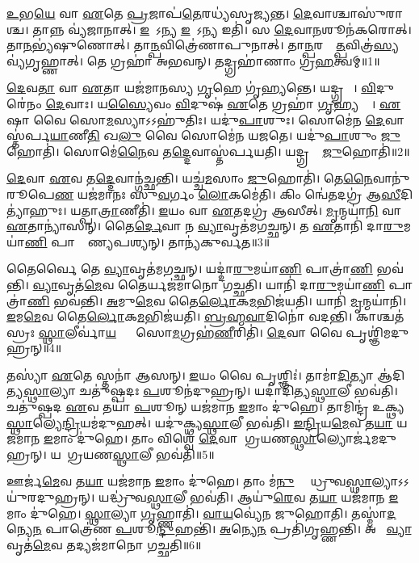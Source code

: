 \ul{𑌉}𑌭\ul{𑌯𑍇} 𑌵𑌾 \ul{𑌏}𑌤𑍇 \ul{𑌪𑍍𑌰}𑌜𑌾𑌪॑\ul{𑌤𑍇}𑌰𑌧𑍍𑌯॑𑌸𑍃𑌜𑍍𑌯𑌨𑍍𑌤।
\ul{𑌦𑍇}𑌵𑌾𑌶𑍍𑌚𑌾𑌸𑍁॑𑌰𑌾𑌶𑍍𑌚।
𑌤𑌾𑌨𑍍𑌨 𑌵𑍍𑌯॑𑌜𑌾𑌨𑌾𑌤𑍍।
\ul{𑌇}𑌮𑍇᳚𑌽𑌨𑍍𑌯 \ul{𑌇}𑌮𑍇᳚𑌽𑌨𑍍𑌯 𑌇𑌤𑌿॑।
𑌸 \ul{𑌦𑍇}𑌵𑌾\ul{𑌨}\ul{}𑌶𑍂𑌨॑𑌕𑌰𑍋𑌤𑍍।
𑌤𑌾\ul{𑌨}𑌭𑍍𑌯॑𑌷𑍁𑌣𑍋𑌤𑍍।
𑌤𑌾\ul{𑌨𑍍𑌪}𑌵𑌿𑌤𑍍𑌰𑍇॑𑌣𑌾𑌪𑍁𑌨𑌾𑌤𑍍।
𑌤𑌾\ul{𑌨𑍍𑌪}𑌰𑌸𑍍𑌤𑌾᳚\ul{𑌤𑍍𑌪}𑌵𑌿𑌤𑍍𑌰॑\ul{𑌸𑍍𑌯} 𑌵𑍍𑌯॑𑌗𑍃𑌹𑍍𑌣𑌾𑌤𑍍।
𑌤𑍇 𑌗𑍍𑌰𑌹𑌾॑ 𑌅𑌭𑌵𑌨𑍍।
𑌤𑌦𑍍𑌗𑍍𑌰𑌹𑌾॑𑌣𑌾𑌂 𑌗𑍍𑌰\ul{𑌹}𑌤𑍍𑌵𑌮𑍍॥1॥

\ul{𑌦𑍇}𑌵\ul{𑌤𑌾} 𑌵𑌾 \ul{𑌏}𑌤𑌾 𑌯𑌜॑𑌮𑌾𑌨𑌸𑍍𑌯 \ul{𑌗𑍃}𑌹𑍇 𑌗𑍃॑𑌹𑍍𑌯𑌨𑍍𑌤𑍇।
𑌯𑌦𑍍𑌗𑍍𑌰𑌹𑌾𑌃᳚।
\ul{𑌵𑌿}𑌦𑍁𑌰𑍇॑𑌨𑌂 \ul{𑌦𑍇}𑌵𑌾𑌃।
𑌯\ul{𑌸𑍍𑌯𑍈}𑌵𑌂 \ul{𑌵𑌿}𑌦𑍁𑌷॑ \ul{𑌏}𑌤𑍇 𑌗𑍍𑌰𑌹𑌾॑ \ul{𑌗𑍃}𑌹𑍍𑌯𑌨𑍍𑌤𑍇᳚।
\ul{𑌏}𑌷𑌾 𑌵𑍈 𑌸𑍋\ul{𑌮}𑌸𑍍𑌯𑌾\-𑌽𑌽𑌹𑍁॑𑌤𑌿𑌃।
𑌯𑌦𑍁॑\ul{𑌪𑌾}\ul{}𑌶𑍁𑌃।
𑌸𑍋𑌮𑍇॑𑌨 \ul{𑌦𑍇}𑌵𑌾𑌸𑍍𑌤॑𑌰𑍍𑌪\ul{𑌯𑌾}𑌣𑍀\ul{𑌤𑌿} 𑌖\ul{𑌲𑍁} 𑌵𑍈 𑌸𑍋𑌮𑍇॑𑌨 𑌯𑌜𑌤𑍇।
𑌯𑌦𑍁॑\ul{𑌪𑌾}\ul{}𑌶𑍁𑌂 \ul{𑌜𑍁}𑌹𑍋𑌤𑌿॑।
𑌸𑍋𑌮𑍇॑\ul{𑌨𑍈}𑌵 𑌤\ul{𑌦𑍍𑌦𑍇}𑌵𑌾𑌸𑍍𑌤॑𑌰𑍍𑌪𑌯𑌤𑌿।
𑌯𑌦𑍍𑌗𑍍𑌰𑌹𑌾𑌂᳚ \ul{𑌜𑍁}𑌹𑍋𑌤𑌿॑॥2॥

\ul{𑌦𑍇}𑌵𑌾 \ul{𑌏}𑌵 𑌤\ul{𑌦𑍍𑌦𑍇}𑌵𑌾𑌨𑍍𑌗॑𑌚𑍍𑌛𑌨𑍍𑌤𑌿।
𑌯𑌚𑍍𑌚॑\ul{𑌮}𑌸𑌾𑌂 \ul{𑌜𑍁}𑌹𑍋𑌤𑌿॑।
𑌤𑍇\ul{𑌨𑍈}𑌵𑌾𑌨𑍁॑𑌰𑍂𑌪𑍇\ul{𑌣} 𑌯𑌜॑𑌮𑌾𑌨𑌃 𑌸𑍁\ul{𑌵}𑌰𑍍𑌗𑌂 \ul{𑌲𑍋}𑌕𑌮𑍇॑𑌤𑌿।
𑌕𑌿𑌂 𑌨𑍍𑌵𑍇॑𑌤𑌦𑌗𑍍𑌰॑ 𑌆\ul{𑌸𑍀}𑌦𑌿𑌤𑍍𑌯𑌾॑𑌹𑍁𑌃।
𑌯𑌤𑍍𑌪𑌾\ul{𑌤𑍍𑌰𑌾}𑌣𑍀𑌤𑌿॑।
\ul{𑌇}𑌯𑌂 𑌵𑌾 \ul{𑌏}𑌤𑌦𑌗𑍍𑌰॑ 𑌆𑌸𑍀𑌤𑍍।
\ul{𑌮𑍃}𑌨𑍍𑌮𑌯𑌾॑\ul{𑌨𑌿} 𑌵𑌾 \ul{𑌏}𑌤𑌾𑌨𑍍𑌯𑌾॑𑌸𑌨𑍍।
𑌤𑍈\ul{𑌰𑍍𑌦𑍇}𑌵𑌾 𑌨 \ul{𑌵𑍍𑌯𑌾}𑌵𑍃𑌤॑𑌮𑌗𑌚𑍍𑌛𑌨𑍍।
𑌤 \ul{𑌏}𑌤𑌾𑌨𑌿॑ 𑌦𑌾\ul{𑌰𑍁}𑌮𑌯𑌾॑\ul{𑌣𑌿} 𑌪𑌾𑌤𑍍𑌰𑌾᳚𑌣𑍍𑌯𑌪𑌶𑍍𑌯𑌨𑍍।
𑌤𑌾𑌨𑍍𑌯॑𑌕𑍁𑌰𑍍𑌵𑌤॥3॥

𑌤𑍈𑌰𑍍𑌵𑍈 𑌤𑍇 \ul{𑌵𑍍𑌯𑌾}𑌵𑍃𑌤॑𑌮𑌗𑌚𑍍𑌛𑌨𑍍।
𑌯𑌦𑍍𑌦𑌾॑\ul{𑌰𑍁}𑌮𑌯𑌾॑\ul{𑌣𑌿} 𑌪𑌾𑌤𑍍𑌰𑌾॑\ul{𑌣𑌿} 𑌭𑌵॑𑌨𑍍𑌤𑌿।
\ul{𑌵𑍍𑌯𑌾}𑌵𑍃𑌤॑\ul{𑌮𑍇}𑌵 𑌤𑍈𑌰𑍍𑌯𑌜॑𑌮𑌾𑌨𑍋 𑌗𑌚𑍍𑌛𑌤𑌿।
𑌯𑌾𑌨𑌿॑ 𑌦𑌾\ul{𑌰𑍁}𑌮𑌯𑌾॑\ul{𑌣𑌿} 𑌪𑌾𑌤𑍍𑌰𑌾॑\ul{𑌣𑌿} 𑌭𑌵॑𑌨𑍍𑌤𑌿।
\ul{𑌅}𑌮𑍁\ul{𑌮𑍇}𑌵 𑌤𑍈\ul{𑌰𑍍𑌲𑍋}𑌕\ul{𑌮}𑌭𑌿𑌜॑𑌯𑌤𑌿।
𑌯𑌾𑌨𑌿॑ \ul{𑌮𑍃}𑌨𑍍𑌮𑌯𑌾॑𑌨𑌿।
\ul{𑌇}𑌮\ul{𑌮𑍇}𑌵 𑌤𑍈\ul{𑌰𑍍𑌲𑍋}𑌕\ul{𑌮}𑌭𑌿𑌜॑𑌯𑌤𑌿।
\ul{𑌬𑍍𑌰}\ul{𑌹𑍍𑌮}\ul{𑌵𑌾}𑌦𑌿𑌨𑍋॑ 𑌵𑌦𑌨𑍍𑌤𑌿।
𑌕𑌾𑌶𑍍𑌚𑌤॑𑌸𑍍𑌰𑌃 \ul{𑌸𑍍𑌥𑌾}𑌲𑍀𑌰𑍍𑌵𑌾॑\ul{𑌯}𑌵𑍍𑌯𑌾𑌃᳚ 𑌸𑍋\ul{𑌮}𑌗𑍍𑌰𑌹॑\ul{𑌣𑍀}𑌰𑌿𑌤𑌿॑।
\ul{𑌦𑍇}𑌵𑌾 𑌵𑍈 𑌪𑍃𑌶𑍍𑌞𑌿॑𑌮𑌦𑍁𑌹𑍍𑌰𑌨𑍍॥4॥

𑌤𑌸𑍍𑌯𑌾॑ \ul{𑌏}𑌤𑍇 𑌸𑍍𑌤𑌨𑌾॑ 𑌆𑌸𑌨𑍍।
\ul{𑌇}𑌯𑌂 𑌵𑍈 𑌪𑍃𑌶𑍍𑌞𑌿𑌃॑।
𑌤𑌾𑌮𑌾॑\ul{𑌦𑌿}𑌤𑍍𑌯𑌾 𑌆॑𑌦𑌿𑌤𑍍𑌯\ul{𑌸𑍍𑌥𑌾}𑌲𑍍𑌯𑌾 𑌚𑌤𑍁॑𑌷𑍍𑌪𑌦𑌃 \ul{𑌪}𑌶𑍂𑌨॑𑌦𑍁𑌹𑍍𑌰𑌨𑍍।
𑌯𑌦𑌾॑𑌦𑌿𑌤𑍍𑌯\ul{𑌸𑍍𑌥𑌾}𑌲𑍀 𑌭𑌵॑𑌤𑌿।
𑌚𑌤𑍁॑𑌷𑍍𑌪𑌦 \ul{𑌏}𑌵 𑌤𑌯𑌾॑ \ul{𑌪}𑌶𑍂𑌨𑍍 𑌯𑌜॑𑌮𑌾𑌨 \ul{𑌇}𑌮𑌾𑌂 𑌦𑍁॑𑌹𑍇।
𑌤𑌾𑌮𑌿𑌨𑍍𑌦𑍍𑌰॑ 𑌉𑌕𑍍𑌥𑍍𑌯\ul{𑌸𑍍𑌥𑌾}𑌲𑍍𑌯𑍇\ul{𑌨𑍍𑌦𑍍𑌰𑌿}𑌯𑌮॑𑌦𑍁𑌹𑌤𑍍।
𑌯𑌦𑍁॑𑌕𑍍𑌥𑍍𑌯\ul{𑌸𑍍𑌥𑌾}𑌲𑍀 𑌭𑌵॑𑌤𑌿।
\ul{𑌇}\ul{𑌨𑍍𑌦𑍍𑌰𑌿}𑌯\ul{𑌮𑍇}𑌵 𑌤\ul{𑌯𑌾} 𑌯𑌜॑𑌮𑌾𑌨 \ul{𑌇}𑌮𑌾𑌂 𑌦𑍁॑𑌹𑍇।
𑌤𑌾𑌂 𑌵𑌿𑌶𑍍𑌵𑍇॑ \ul{𑌦𑍇}𑌵𑌾 𑌆᳚𑌗𑍍𑌰𑌯𑌣\ul{𑌸𑍍𑌥𑌾}𑌲𑍍𑌯𑍋𑌰𑍍𑌜॑𑌮𑌦𑍁𑌹𑍍𑌰𑌨𑍍।
𑌯𑌦𑌾᳚𑌗𑍍𑌰𑌯𑌣\ul{𑌸𑍍𑌥𑌾}𑌲𑍀 𑌭𑌵॑𑌤𑌿॥5॥

𑌊𑌰𑍍𑌜॑\ul{𑌮𑍇}𑌵 𑌤\ul{𑌯𑌾} 𑌯𑌜॑𑌮𑌾𑌨 \ul{𑌇}𑌮𑌾𑌂 𑌦𑍁॑𑌹𑍇।
𑌤𑌾𑌂 𑌮॑\ul{𑌨𑍁}𑌷𑍍𑌯𑌾᳚ 𑌧𑍍𑌰𑍁𑌵\ul{𑌸𑍍𑌥𑌾}𑌲𑍍𑌯𑌾\-𑌽𑌽𑌯𑍁॑𑌰𑌦𑍁𑌹𑍍𑌰𑌨𑍍।
𑌯𑌦𑍍𑌧𑍍𑌰𑍁॑𑌵\ul{𑌸𑍍𑌥𑌾}𑌲𑍀 𑌭𑌵॑𑌤𑌿।
𑌆𑌯𑍁॑\ul{𑌰𑍇}𑌵 𑌤\ul{𑌯𑌾} 𑌯𑌜॑𑌮𑌾𑌨 \ul{𑌇}𑌮𑌾𑌂 𑌦𑍁॑𑌹𑍇।
\ul{𑌸𑍍𑌥𑌾}𑌲𑍍𑌯𑌾 \ul{𑌗𑍃}𑌹𑍍𑌣𑌾𑌤𑌿॑।
\ul{𑌵𑌾}\ul{𑌯}𑌵𑍍𑌯𑍇॑𑌨 𑌜𑍁𑌹𑍋𑌤𑌿।
𑌤𑌸𑍍𑌮𑌾॑\ul{𑌦}𑌨𑍍𑌯𑍇\ul{𑌨} 𑌪𑌾𑌤𑍍𑌰𑍇॑𑌣 \ul{𑌪}𑌶𑍂\ul{𑌨𑍍𑌦𑍁}𑌹𑌨𑍍𑌤𑌿॑।
\ul{𑌅}𑌨𑍍𑌯𑍇\ul{𑌨} 𑌪𑍍𑌰𑌤𑌿॑\-𑌗𑍃𑌹𑍍𑌣𑌨𑍍𑌤𑌿।
𑌅𑌥𑍋᳚ \ul{𑌵𑍍𑌯𑌾}𑌵𑍃𑌤॑\ul{𑌮𑍇}𑌵 𑌤𑌦𑍍𑌯𑌜॑𑌮𑌾𑌨𑍋 𑌗𑌚𑍍𑌛𑌤𑌿॥6॥\anuvakamend[\ul{𑌗𑍍𑌰}\ul{𑌹}𑌤𑍍𑌵𑌂 𑌗𑍍𑌰𑌹𑌾𑌂᳚ \ul{𑌜𑍁}𑌹𑍋𑌤𑍍𑌯॑𑌕𑍁𑌰𑍍𑌵𑌤𑌾𑌦𑍁𑌹𑍍𑌰𑌨𑍍𑌨𑌾𑌗𑍍𑌰𑌯𑌣\ul{𑌸𑍍𑌥𑌾}𑌲𑍀 𑌭𑌵॑\ul{𑌤𑌿} 𑌨𑌵॑ 𑌚]

